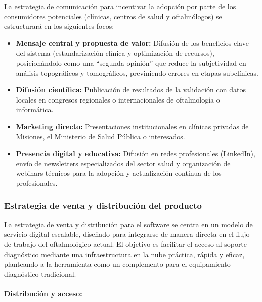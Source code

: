             La estrategia de comunicación para incentivar la adopción por parte de los consumidores potenciales (clínicas, centros de salud y oftalmólogos) se estructurará en los siguientes focos:
        
            \begin{itemize}
                 \item \textbf{Mensaje central y propuesta de valor:} Difusión de los beneficios clave del sistema (estandarización clínica y optimización de recursos), posicionándolo como una ``segunda opinión'' que reduce la subjetividad en análisis topográficos y tomográficos, previniendo errores en etapas subclínicas.  
            
                \item \textbf{Difusión científica:} Publicación de resultados de la validación con datos locales en congresos regionales o internacionales de oftalmología o informática.  
        
                \item \textbf{Marketing directo:} Presentaciones institucionales en clínicas privadas de Misiones, el Ministerio de Salud Pública o interesados.  
        
                \item \textbf{Presencia digital y educativa:} Difusión en redes profesionales (LinkedIn), envío de newsletters especializados del sector salud y organización de webinars técnicos para la adopción y actualización continua de los profesionales.
            \end{itemize}
        
            \subsubsection{Estrategia de venta y distribución del producto}
        
                La estrategia de venta y distribución para el software se centra en un modelo de servicio digital escalable, diseñado para integrarse de manera directa en el flujo de trabajo del oftalmológico actual. El objetivo es facilitar el acceso al soporte diagnóstico mediante una infraestructura en la nube práctica, rápida y eficaz, planteando a la herramienta como un complemento para el equipamiento diagnóstico tradicional.

            \vspace{-0.5 cm}
            \paragraph{Distribución y acceso:}
            
